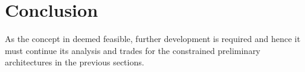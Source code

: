 \section{Conclusion}

As the concept in deemed feasible, further development is required and hence it must continue its analysis and trades for the constrained preliminary architectures in the previous sections.
